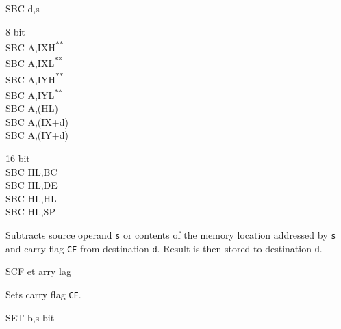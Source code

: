 \documentclass[12pt,twoside,openright,a4paper]{book}
\newcommand{\UNDOC}{\textnormal{\textsuperscript{**}}}
\begin{document}
\begin{basedescript}{
	\desclabelstyle{\multilinelabel}
	\desclabelwidth{3cm}}
\begin{DetailItem}{SBC d,s}
\begin{DetailVariants}
			\columnbreak
			\textnormal{8 bit}\\
			SBC A,IXH\UNDOC\\
			SBC A,IXL\UNDOC\\
			SBC A,IYH\UNDOC\\
			SBC A,IYL\UNDOC\\
			SBC A,(HL)\\
			SBC A,(IX+d)\\
			SBC A,(IY+d)

			\columnbreak
			\textnormal{16 bit}\\
			SBC HL,BC\\
			SBC HL,DE\\
			SBC HL,HL\\
			SBC HL,SP
		\end{DetailVariants}
		
		Subtracts source operand {\tt s} or contents of the memory location addressed by {\tt s} and carry flag {\tt CF} from destination {\tt d}. Result is then stored to destination {\tt d}.

		\begin{DetailEffects}[v]
			\FlagsSBCr[8-bit]
			\FlagsSBCrr[16-bit]
		\end{DetailEffects}
						
		\begin{DetailTiming}
		\end{DetailTiming}

	\end{DetailItem}

	\begin{DetailItem}{SCF}
		{et arry \IH{F}lag}
		{\SymSCF}

		Sets carry flag {\tt CF}.

		\begin{DetailEffects}
			\FlagsSCF
		\end{DetailEffects}
						
		\begin{DetailTiming}
			\DetailTime{}{1}{4}
		\end{DetailTiming}

	\end{DetailItem}

	\pagebreak
	\begin{DetailItem}{SET b,s}
		{ bit}
		{\SymSET{s}}


\end{DetailItem}
\end{basedescript}
\end{document}
